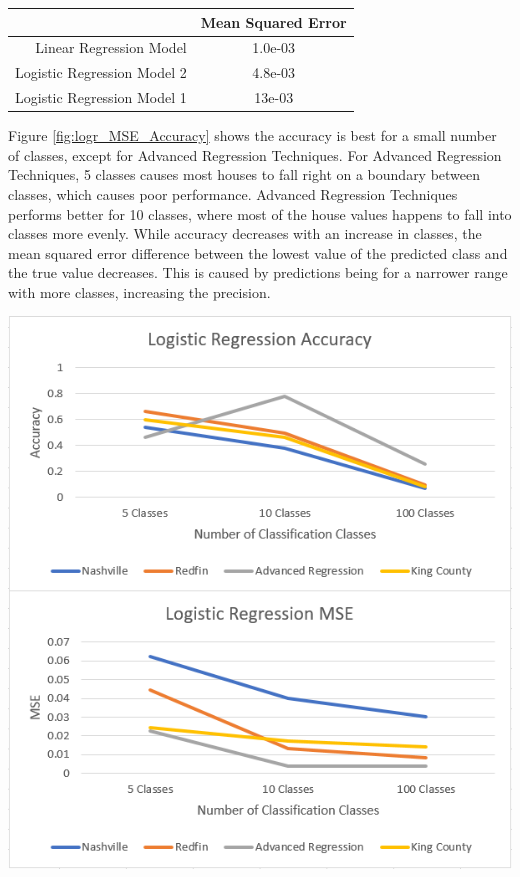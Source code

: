 \documentclass[10pt]{article}
\begin{document}
\begin{multicols}{2}
		\par
        	\captionsetup{type=table}
			\begin{tabular}{r|c}
				& \small{Mean Squared Error} \\
				\hline
				\small{Linear Regression Model} & \small{1.0e-03} \\
				\hline
				\small{Logistic Regression Model 2} & \small{4.8e-03} \\
				\hline
				\small{Logistic Regression Model 1} & \small{13e-03} \\
				\hline
			\end{tabular}
			\label{table:logr_performance}        
			\setlength{\parindent}{15pt}
		\par
			Figure \ref{fig:logr_MSE_Accuracy} shows the accuracy is best for a small number of classes, except for Advanced Regression Techniques. For Advanced Regression Techniques, 5 classes causes most houses to fall right on a boundary between classes, which causes poor performance. Advanced Regression Techniques performs better for 10 classes, where most of the house values happens to fall into classes more evenly. While accuracy decreases with an increase in classes, the mean squared error difference between the lowest value of the predicted class and the true value decreases. This is caused by predictions being for a narrower range with more classes, increasing the precision.
		\par
		\begin{center}
	            \captionsetup{type=figure}
			\includegraphics[scale=0.6]{Images/LogisticRegressionMSEAccuracy} \\

\end{center}
\end{multicols}
\end{document}
